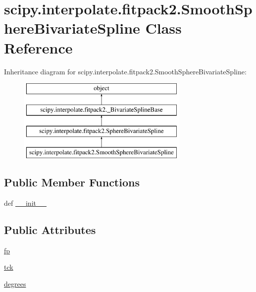 \hypertarget{classscipy_1_1interpolate_1_1fitpack2_1_1SmoothSphereBivariateSpline}{}\section{scipy.\+interpolate.\+fitpack2.\+Smooth\+Sphere\+Bivariate\+Spline Class Reference}
\label{classscipy_1_1interpolate_1_1fitpack2_1_1SmoothSphereBivariateSpline}
Inheritance diagram for scipy.\+interpolate.\+fitpack2.\+Smooth\+Sphere\+Bivariate\+Spline\+:\begin{figure}[H]
\begin{center}
\leavevmode
\includegraphics[height=4.000000cm]{classscipy_1_1interpolate_1_1fitpack2_1_1SmoothSphereBivariateSpline}
\end{center}
\end{figure}
\subsection*{Public Member Functions}
\begin{DoxyCompactItemize}
\item 
def \hyperlink{classscipy_1_1interpolate_1_1fitpack2_1_1SmoothSphereBivariateSpline_aa30655f385e11fd11eb24ce631c24e59}{\+\_\+\+\_\+init\+\_\+\+\_\+}
\end{DoxyCompactItemize}
\subsection*{Public Attributes}
\begin{DoxyCompactItemize}
\item 
\hyperlink{classscipy_1_1interpolate_1_1fitpack2_1_1SmoothSphereBivariateSpline_a7c891843e01965ad43419704abce494d}{fp}
\item 
\hyperlink{classscipy_1_1interpolate_1_1fitpack2_1_1SmoothSphereBivariateSpline_a2ff423e3917cc27ae7267453bab16358}{tck}
\item 
\hyperlink{classscipy_1_1interpolate_1_1fitpack2_1_1SmoothSphereBivariateSpline_a4138a944f9c277f7da3d5a176d7ea4c9}{degrees}
\end{DoxyCompactItemize}


